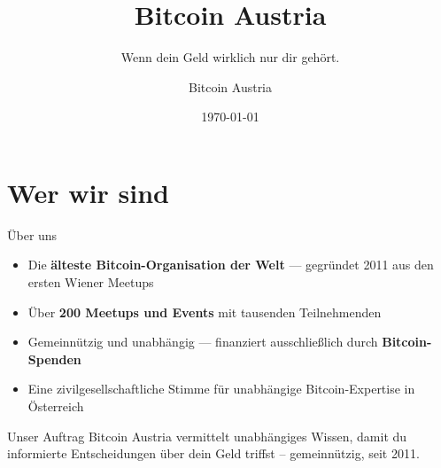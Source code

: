%
\usepackage{../bitcoin-austria}

\title{Bitcoin Austria}
\subtitle{Wenn dein Geld wirklich nur dir gehört.}
\author{Bitcoin Austria}
\date{\today}



\begin{frame}
  \titlepage
\end{frame}

\section{Wer wir sind}

\begin{frame}{Über uns}
  \noindent\begin{minipage}[t]{0.68\textwidth}
    \begin{itemize}
      \item Die \textbf{älteste Bitcoin-Organisation der Welt} — gegründet
        2011 aus den ersten Wiener Meetups
      \item Über \textbf{200 Meetups und Events} mit tausenden Teilnehmenden
      \item Gemeinnützig und unabhängig — finanziert ausschließlich durch
        \textbf{Bitcoin-Spenden}
      \item Eine zivilgesellschaftliche Stimme für unabhängige
        Bitcoin-Expertise in Österreich
    \end{itemize}
  \end{minipage}

  \vfill
  \begin{block}{Unser Auftrag}
    Bitcoin Austria vermittelt unabhängiges Wissen, damit du informierte
    Entscheidungen über dein Geld triffst – gemeinnützig, seit 2011.
  \end{block}
\end{frame}

